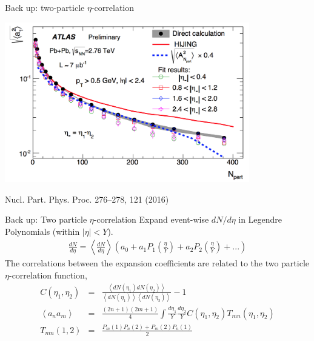 \documentclass[11pt]{beamer}
\begin{document}
\begin{frame}[noframenumbering]{Back up: two-particle $\eta$-correlation}
\begin{center}
\includegraphics[width=0.8\textwidth]{atlas-hijing.png}\\
\end{center}
\tiny Nucl. Part. Phys. Proc. 276–278, 121 (2016)
\end{frame}

\begin{frame}[noframenumbering]{Back up: Two particle $\eta$-correlation}
Expand event-wise $dN/d\eta$ in Legendre Polynomials (within $|\eta|<Y$). 
\begin{eqnarray}
\nonumber
\frac{dN}{d\eta} = \left\langle \frac{dN}{d\eta} \right\rangle \left(a_0 + a_1 P_1\left(\frac{\eta}{Y}\right) + a_2 P_2\left(\frac{\eta}{Y}\right) + ...\right)
\end{eqnarray}
The correlations between the expansion coefficients are related to the two particle $\eta$-correlation function,
\begin{eqnarray}
\nonumber
C(\eta_1,\eta_2) &=& \frac{\left\langle dN(\eta_1)dN(\eta_2)\right\rangle}{\left\langle dN(\eta_1)\right\rangle\left\langle dN(\eta_2)\right\rangle}-1\\
\nonumber
\left\langle a_n a_m\right\rangle &=& \frac{(2n+1)(2m+1)}{4} \int \frac{d\eta_1}{Y}\frac{d\eta_2}{Y} C(\eta_1,\eta_2)T_{mn}(\eta_1,\eta_2)\\
T_{mn}(1,2) &=& \frac{P_m(1)P_n(2)+P_m(2)P_n(1)}{2}
\end{eqnarray}
\end{frame}
\end{document}
